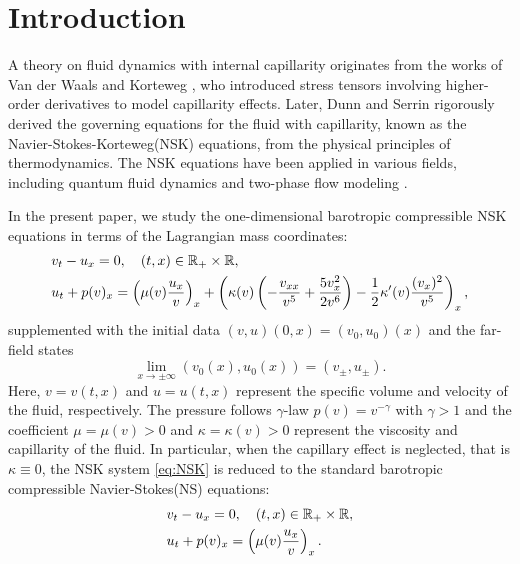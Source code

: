 \documentclass[11pt,reqno]{amsart}
\begin{document}
\maketitle

\section{Introduction}\label{sec:1}
\setcounter{equation}{0}

A theory on fluid dynamics with internal capillarity originates from the works of Van der Waals \cite{V94} and Korteweg \cite{K01}, who introduced stress tensors involving higher-order derivatives to model capillarity effects. Later, Dunn and Serrin \cite{DS85} rigorously derived the governing equations for the fluid with capillarity, known as the Navier-Stokes-Korteweg(NSK) equations, from the physical principles of thermodynamics. The NSK equations have been applied in various fields, including quantum fluid dynamics and two-phase flow modeling \cite{AS22, BGV19, BVY21}. 

In the present paper, we study the one-dimensional barotropic compressible NSK equations in terms of the Lagrangian mass coordinates:
\begin{equation}\label{eq:NSK}
\begin{aligned}
&v_t-u_x=0,\quad (t,x)\in \mathbb R_+\times\mathbb R,\\
&u_t+p(v)_x=\left(\mu(v)\frac{u_x}{v}\right)_x + \left( \kappa(v) \left(  -\frac{v_{xx}}{v^5} + \frac{5v_x^2}{2v^6}\right)-\frac{1}{2} \kappa'(v) \frac{(v_x)^2}{v^5} \right)_x,
\end{aligned}
\end{equation}
 supplemented with the initial data
 $(v,u)(0,x)=(v_0,u_0)(x)$
 and the far-field states 
\begin{equation}\label{end states}
\lim_{x \to \pm \infty} (v_0(x),u_0(x))=(v_\pm,u_\pm).
\end{equation}
Here,  $v=v(t,x)$ and $u=u(t,x)$ represent the specific volume and velocity of the fluid, respectively. The pressure follows $\gamma$-law $p(v)=v^{-\gamma}$ with $\gamma>1$ and the coefficient $\mu=\mu(v)>0$ and $\kappa=\kappa(v)>0$ represent the viscosity and capillarity of the fluid. In particular, when the capillary effect is neglected, that is $\kappa\equiv0$, the NSK system \eqref{eq:NSK} is reduced to the standard barotropic compressible Navier-Stokes(NS) equations:
\begin{equation}
\begin{aligned}\label{eq:NS}
&v_t-u_x=0,\quad (t,x)\in\mathbb R_+\times\mathbb R,\\
&u_t +p(v)_x=\left(\mu(v)\frac{u_x}{v}\right)_x.
\end{aligned}
\end{equation}
\end{document}
